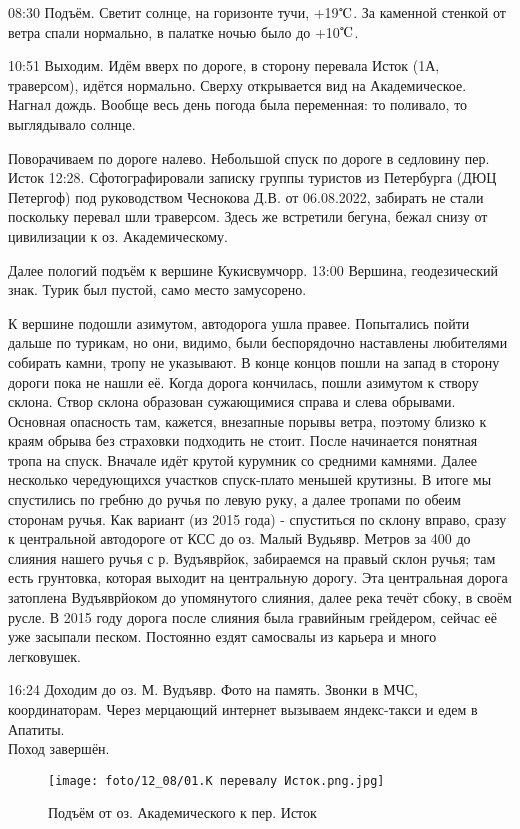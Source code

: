 08:30 Подъём. Светит солнце, на горизонте тучи, +19$\tccentigrade$.
За каменной стенкой от ветра спали нормально, в палатке ночью было до +10$\tccentigrade$.

10:51 Выходим. Идём вверх по дороге, в сторону перевала Исток (1А, траверсом), идётся нормально.
Сверху открывается вид на Академическое.
Нагнал дождь. Вообще весь день погода была переменная: то поливало, то выглядывало солнце.

Поворачиваем по дороге налево. Небольшой спуск по дороге в седловину пер. Исток 12:28.
Сфотографировали записку группы туристов из Петербурга (ДЮЦ Петергоф) под руководством Чеснокова Д.В. от 06.08.2022,
забирать не стали поскольку перевал шли траверсом. Здесь же встретили бегуна, бежал снизу от цивилизации к оз. Академическому.

Далее пологий подъём к вершине Кукисвумчорр.
13:00 Вершина, геодезический знак. Турик был пустой, само место замусорено.

К вершине подошли азимутом, автодорога ушла правее. Попытались пойти дальше по турикам, но они, видимо,
были беспорядочно наставлены любителями собирать камни, тропу не указывают. В конце концов пошли на запад
в сторону дороги пока не нашли её. Когда дорога кончилась, пошли азимутом к створу склона.
Створ склона образован сужающимися справа и слева обрывами. Основная опасность там, кажется, внезапные порывы ветра,
поэтому близко к краям обрыва без страховки подходить не стоит. После  начинается понятная тропа на спуск.
Вначале идёт крутой курумник со средними камнями. Далее несколько чередующихся участков спуск-плато меньшей крутизны.
В итоге мы спустились по гребню до ручья по левую руку, а далее тропами по обеим сторонам ручья.
Как вариант (из 2015 года) - спуститься по склону вправо, сразу к центральной автодороге от КСС до оз. Малый Вудьявр.
Метров за 400 до слияния нашего ручья с р. Вудъяврйок, забираемся на правый склон ручья;
там есть грунтовка, которая выходит на центральную дорогу. Эта центральная дорога затоплена Вудъяврйоком до упомянутого слияния,
далее река течёт сбоку, в своём русле. В 2015 году дорога после слияния была гравийным грейдером,
сейчас её уже засыпали песком. Постоянно ездят самосвалы из карьера и много легковушек.

16:24 Доходим до оз. М. Вудъявр. Фото на память. Звонки в МЧС, координаторам.
Через мерцающий интернет вызываем яндекс-такси и едем в Апатиты.\\
Поход завершён.

\begin{figure}
    \centering
    \texttt{[image: foto/12\_08/01.К перевалу Исток.png.jpg]}
    \caption{Подъём от оз. Академического к пер. Исток}
\end{figure}

